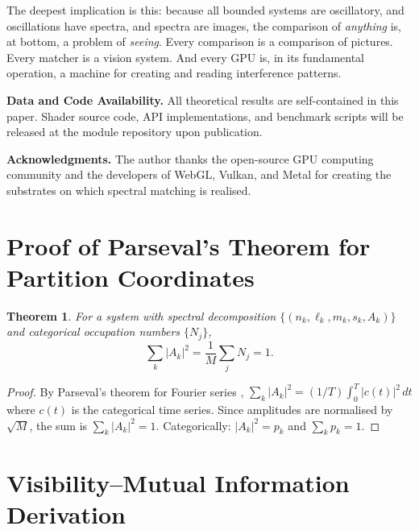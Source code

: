 \documentclass[11pt,twocolumn,a4paper]{article}
\newtheorem{theorem}{Theorem}[section]
\begin{document}
The deepest implication is this: because all bounded systems are
oscillatory, and oscillations have spectra, and spectra are images,
the comparison of \emph{anything} is, at bottom, a problem of
\emph{seeing}. Every comparison is a comparison of pictures. Every
matcher is a vision system. And every GPU is, in its fundamental
operation, a machine for creating and reading interference patterns.

\vspace{1em}
\noindent\textbf{Data and Code Availability.}
All theoretical results are self-contained in this paper. Shader source
code, API implementations, and benchmark scripts will be released at
the module repository upon publication.

\vspace{1em}
\noindent\textbf{Acknowledgments.}
The author thanks the open-source GPU computing community and the
developers of WebGL, Vulkan, and Metal for creating the substrates
on which spectral matching is realised.



\appendix

\section{Proof of Parseval's Theorem for Partition Coordinates}
\label{app:parseval}

\begin{theorem}
For a system with spectral decomposition
$\{(n_k, \ell_k, m_k, s_k, A_k)\}$ and categorical occupation numbers
$\{N_j\}$,
\begin{equation}
\label{eq:parseval}
  \sum_k |A_k|^2 = \frac{1}{M} \sum_j N_j = 1.
\end{equation}
\end{theorem}

\begin{proof}
By Parseval's theorem for Fourier series \citep{fourier1822},
$\sum_k |A_k|^2 = (1/T) \int_0^T |c(t)|^2 \, dt$ where $c(t)$ is the
categorical time series. Since amplitudes are normalised by $\sqrt{M}$,
the sum is $\sum_k |A_k|^2 = 1$. Categorically:
$|A_k|^2 = p_k$ and $\sum_k p_k = 1$.
\end{proof}


\section{Visibility--Mutual Information Derivation}
\label{app:visibility_mi}
\end{document}
